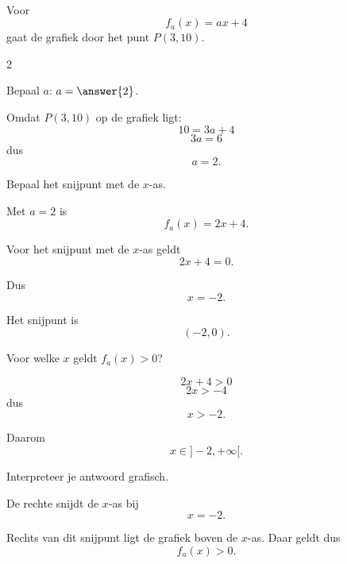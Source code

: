 \documentclass{ximera}
\begin{document}
    \begin{oefening}{\oefG}
    \\
    
    Voor
    \[
    f_a(x)=ax+4
    \]
    gaat de grafiek door het punt $P(3,10)$.
    
    \begin{multicols}{2}
    
    \begin{question}
    Bepaal $a$: $a=\answer{2}$.
    
    \begin{oplossing}
    Omdat $P(3,10)$ op de grafiek ligt:
    \[
    10=3a+4
    \]
    \[
    3a=6
    \]
    dus
    \[
    a=2.
    \]
    \end{oplossing}
    \end{question}
    
    
    \begin{question}
    Bepaal het snijpunt met de $x$-as.
    
    \begin{oplossing}
    Met $a=2$ is
    \[
    f_a(x)=2x+4.
    \]
    
    Voor het snijpunt met de $x$-as geldt
    \[
    2x+4=0.
    \]
    
    Dus
    \[
    x=-2.
    \]
    
    Het snijpunt is
    \[
    \boxed{(-2,0)}.
    \]
    \end{oplossing}
    \end{question}
    
    
    \begin{question}
    Voor welke $x$ geldt $f_a(x)>0$?
    
    \begin{oplossing}
    \[
    2x+4>0
    \]
    \[
    2x>-4
    \]
    dus
    \[
    x>-2.
    \]
    
    Daarom
    \[
    x\in]-2,+\infty[.
    \]
    \end{oplossing}
    \end{question}
    
    
    \begin{question}
    Interpreteer je antwoord grafisch.
    
    \begin{oplossing}
    De rechte snijdt de $x$-as bij
    \[
    x=-2.
    \]
    
    Rechts van dit snijpunt ligt de grafiek boven de $x$-as. Daar geldt dus
    \[
    f_a(x)>0.
    \]
    \end{oplossing}
    \end{question}
    

\end{multicols}
\end{oefening}
\end{document}
